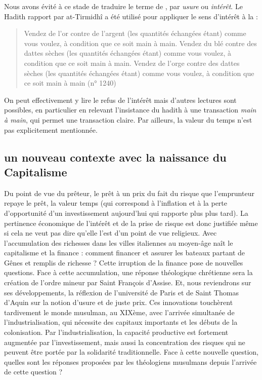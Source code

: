   Nous avons évité à ce stade de traduire le terme de \textit{\riba}, par \textit{usure} ou \textit{intérêt}. Le Hadith rapport par at-Tirmidhî a été utilisé pour appliquer le sens d'intérêt à la \textit{\riba}  : 
 \begin{quote}
     Vendez de l'or contre de l'argent (les quantités échangées étant) comme vous voulez, à condition que ce soit main à main. Vendez du blé contre des dattes sèches (les quantités échangées étant) comme vous voulez, à condition que ce soit main à main. Vendez de l'orge contre des dattes sèches (les quantités échangées étant) comme vous voulez, à condition que ce soit main à main (n° 1240)
 \end{quote}  
 On peut effectivement y lire le refus de l'intérêt mais d'autres lectures sont possibles, en particulier en relevant l'insistance du hadith à une transaction \textit{main à main}, qui permet une transaction claire. Par ailleurs, la valeur du temps n'est pas explicitement mentionnée.
 

 
\subsection{un nouveau contexte avec la naissance du Capitalisme}
Du point de vue du prêteur, le prêt à un prix du fait du risque  que l'emprunteur repaye le prêt, la valeur temps (qui correspond à l'inflation et à la perte d'opportunité d'un investissement aujourd'hui qui rapporte plus plus tard). La pertinence économique de l'intérêt et de la prise de risque est donc justifiée même si cela ne veut pas dire qu'elle l'est d'un point de vue religieux.
Avec l'accumulation des richesses dans les villes italiennes au moyen-âge naît le capitalisme et la finance : comment financer et assurer les bateaux partant de Gênes et remplis de richesse ? Cette irruption de la finance pose de nouvelles questions.  Face à cette accumulation, une réponse théologique chrétienne sera la création de l'ordre mineur par Saint François d'Assise. Et, nous reviendrons sur ses développements, la réflexion de l'université de Paris et de Saint Thomas d'Aquin sur la notion d'usure et de juste prix.  
Ces innovations touchèrent tardivement le monde musulman, au XIXème, avec l'arrivée simultanée de l'industrialisation, qui nécessite des capitaux importants et les débuts de la colonisation. Par l'industrialisation, la capacité productive est fortement augmentée par l'investissement, mais aussi la concentration des risques qui ne peuvent être portée par la solidarité traditionnelle.
Face à cette nouvelle question, quelles sont les réponses proposées par les théologiens musulmans depuis l'arrivée de cette question ?


